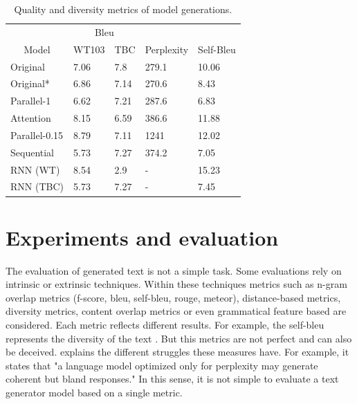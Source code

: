\documentclass[10pt,twocolumn,letterpaper]{article}
\begin{document}
\begin{table}[]
\begin{tabular}{lllll}
\hline
\multicolumn{1}{c}{} & \multicolumn{2}{c}{Bleu} & \multicolumn{1}{c}{\multirow{}{}{}} & \multicolumn{1}{c}{} \\ \cline{2-3}
\multicolumn{1}{c}{\multirow{}{}{Model}}   & WT103       & TBC        & \multicolumn{1}{c}{\multirow{}{}{Perplexity}} & Self-Bleu  \\ \hline
Original \cite{wang2019bert}                & 7.06        & 7.8        & 279.1        & 10.06                                            \\
Original*                            & 6.86        & 7.14        & 270.6             & 8.43                                  \\
Parallel-1                                 & 6.62        & 7.21       & 287.6                    & 6.83                           \\
Attention                                 & 8.15        & 6.59       & 386.6                  &  11.88                          \\
Parallel-0.15                              & 8.79            & 7.11           & 1241         & 12.02                                       \\
Sequential                                & 5.73            & 7.27           & 374.2          & 7.05                                      \\
RNN (WT)                                & 8.54            & 2.9           & -                  & 15.23                              \\
RNN (TBC)                                & 5.73            & 7.27           & -                & 7.45                                \\ \hline
\end{tabular}
\caption{Quality and diversity metrics of model generations.}
\label{tab:results}
\end{table}

\section{Experiments and evaluation}

The evaluation of generated text is not a simple task.
Some evaluations rely on intrinsic or extrinsic techniques.
Within these techniques metrics such as n-gram overlap metrics (f-score, bleu, self-bleu, rouge, meteor),
distance-based metrics, diversity metrics, content overlap metrics or even grammatical feature based
are considered.
Each metric reflects different results.
For example, the self-bleu represents the diversity of the text \cite{texygen}.
But this metrics are not perfect and can also be deceived.
\cite{evaltextgen1} explains the different struggles these measures have.
For example, it states that "a language model optimized only for perplexity
may generate coherent but bland responses."
In this sense, it is not simple to evaluate a text generator model based on a single metric.
\end{document}
